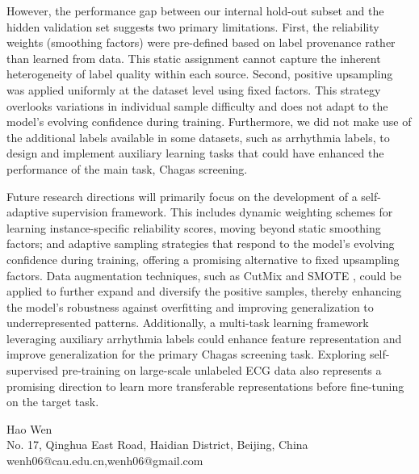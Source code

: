 \documentclass[twocolumn]{cinc}
\begin{document}
However, the performance gap between our internal hold-out subset and the hidden validation set suggests two primary limitations. First, the reliability weights (smoothing factors) were pre-defined based on label provenance rather than learned from data. This static assignment cannot capture the inherent heterogeneity of label quality within each source. Second, positive upsampling was applied uniformly at the dataset level using fixed factors. This strategy overlooks variations in individual sample difficulty and does not adapt to the model's evolving confidence during training. Furthermore, we did not make use of the additional labels available in some datasets, such as arrhythmia labels, to design and implement auxiliary learning tasks that could have enhanced the performance of the main task, Chagas screening.

Future research directions will primarily focus on the development of a self-adaptive supervision framework. This includes dynamic weighting schemes for learning instance-specific reliability scores, moving beyond static smoothing factors; and adaptive sampling strategies that respond to the model's evolving confidence during training, offering a promising alternative to fixed upsampling factors. Data augmentation techniques, such as CutMix \cite{yun2019cutmix} and SMOTE \cite{Chawla_2002_SMOTE}, could be applied to further expand and diversify the positive samples, thereby enhancing the model's robustness against overfitting and improving generalization to underrepresented patterns. Additionally, a multi-task learning framework leveraging auxiliary arrhythmia labels could enhance feature representation and improve generalization for the primary Chagas screening task. Exploring self-supervised pre-training on large-scale unlabeled ECG data also represents a promising direction to learn more transferable representations before fine-tuning on the target task.




% 




% 

\begin{correspondence}
Hao Wen\\
No. 17, Qinghua East Road, Haidian District, Beijing, China\\
wenh06@cau.edu.cn,wenh06@gmail.com
\end{correspondence}

\balance
\end{document}
